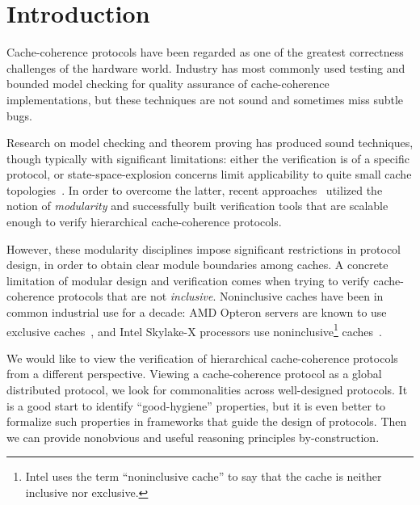 \documentclass[sigplan,10pt,review,anonymous,screen]{acmart}\settopmatter{printfolios=true,printccs=false,printacmref=false}
\begin{document}

\maketitle

\section{Introduction}
\label{sec-intro}


Cache-coherence protocols have been regarded as one of the greatest correctness challenges of the hardware world.
Industry has most commonly used testing and bounded model checking for quality assurance of cache-coherence implementations, but these techniques are not sound and sometimes miss subtle bugs.%

Research on model checking and theorem proving has produced sound techniques, though typically with significant limitations:
either the verification is of a specific protocol, or state-space-explosion concerns limit applicability to quite small cache topologies~\cite{Komuravelli:2014,Murali:2015,Banks:2017,Oswald:2018}.
In order to overcome the latter, recent approaches~\cite{Chen:2008,Chen:2010,McMillan:2016,Opeoluwa:2016,Opeoluwa:2017,Oswald:2020} utilized the notion of \emph{modularity} and successfully built verification tools that are scalable enough to verify hierarchical cache-coherence protocols.

However, these modularity disciplines impose significant restrictions in protocol design, in order to obtain clear module boundaries among caches.
A concrete limitation of modular design and verification comes when trying to verify cache-coherence protocols that are not \emph{inclusive}.
Noninclusive caches have been in common industrial use for a decade: AMD Opteron servers are known to use exclusive caches~\cite{Irazoqui:2016}, and Intel Skylake-X processors use noninclusive\footnote{Intel uses the term ``noninclusive cache'' to say that the cache is neither inclusive nor exclusive.} caches~\cite{intel-non-inclusive,Zhao:2010,Yan:2019}.

We would like to view the verification of hierarchical cache-coherence protocols from a different perspective.
Viewing a cache-coherence protocol as a global distributed protocol, we look for commonalities across well-designed protocols.
It is a good start to identify ``good-hygiene'' properties, but it is even better to formalize such properties in frameworks that guide the design of protocols.
Then we can provide nonobvious and useful reasoning principles by-construction.
\end{document}
